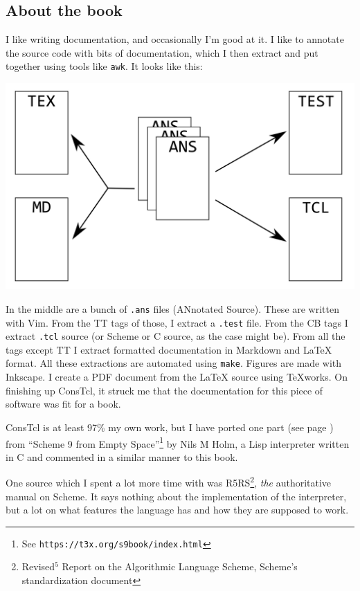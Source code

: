 \documentclass[twoside]{report}
\begin{document}
\subsection{About the book}
\label{about-the-book}


I like writing documentation, and occasionally I'm good at it. I like to
annotate the source code with bits of documentation, which I then extract and
put together using tools like \texttt{awk}. It looks like this:

\includegraphics{images/document.png}

In the middle are a bunch of \texttt{.ans} files (ANnotated Source). These are
written with Vim. From the TT tags of those, I extract a \texttt{.test} file.
From the CB tags I extract \texttt{.tcl} source (or Scheme or C source, as the
case might be). From all the tags except TT I extract formatted documentation
in Markdown and \LaTeX{} format. All these extractions are automated using
\texttt{make}.  Figures are made with Inkscape.  I create a PDF document from
the \LaTeX{} source using TeXworks. On finishing up ConsTcl, it struck me that
the documentation for this piece of software was fit for a book.

ConsTcl is at least 97\% my own work, but I have ported one part (see page
\pageref{resolving-local-defines}) from ``Scheme 9 from Empty
Space''\footnote{See \texttt{https://t3x.org/s9book/index.html}} by Nils M Holm, a Lisp
interpreter written in C and commented in a similar manner to this book.

One source which I spent a lot more time with was R5RS\footnote{Revised${}^{5}$
Report on the Algorithmic Language Scheme, Scheme's standardization document},
\emph{the} authoritative manual on Scheme. It says nothing about the
implementation of the interpreter, but a lot on what features the language has
and how they are supposed to work.
\end{document}

